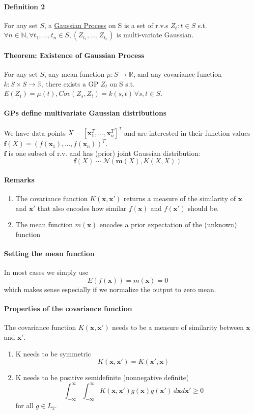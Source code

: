\documentclass[11pt]{article}
\newcommand{\tb}[1]{\textbf{#1}}
\newcommand{\under}[1]{\underline{#1}}
\newcommand{\real}[0]{\mathbb{R}}
\newcommand{\vx}[0]{\tb{x}}
\newcommand{\vf}[0]{\tb{f}}
\newcommand{\vm}[0]{\tb{m}}
\begin{document}
\paragraph{Definition 2}
For any set $S$, a \under{Gaussian Process} on S is a set of r.v.s $Z_t: t\in S$ s.t. $\forall n \in \mathbb{N}, \forall t_1,\hdots,t_n \in S, (Z_{t_1},\hdots, Z_{t_n})$ is multi-variate Gaussian.
\paragraph{Theorem: Existence of Gaussian Process}
For any set $S$, any mean function $\mu: S \rightarrow \real$, and any covariance function $k: S\times S \rightarrow \real$, there exists a GP $Z_t$ on S s.t. $E(Z_t) = \mu(t), Cov(Z_s, Z_t) = k(s,t) \, \forall s, t\in S$.

\paragraph{GPs define multivariate Gaussian distributions}
We have data points $X = [\vx_1^T, \hdots, \vx_n^T]^T$ and are interested in their function values $\tb{f}(X) = (f(\vx_1), \hdots, f(\vx_n))^T$.\\
$\tb{f}$ is one subset of r.v. and has (prior) joint Gaussian distribution:
$$\vf(X) \sim \mathcal{N}(\vm(X),K(X,X))$$
\paragraph{Remarks}
\begin{enumerate}
	\item The covariance function $K(\vx, \vx')$ returns a measure of the similarity of $\vx$ and $\vx'$ that also encodes how similar $f(\vx)$ and $f(\vx')$ should be.
	\item The mean function $m(\vx)$ encodes a prior expectation of the (unknown) function
\end{enumerate}

\paragraph{Setting the mean function}
In most cases we simply use
$$E(f(\vx)) = m(\vx) = 0$$
which makes sense especially if we normalize the output to zero mean.
\paragraph{Properties of the covariance function}
The covariance function $K(\vx,\vx')$ needs to be a measure of similarity between $\vx$ and $\vx'$.
\begin{enumerate}
	\item K needs to be symmetric $$K(\vx, \vx') = K(\vx', \vx)$$
	\item K needs to be positive semidefinite (nonnegative definite) $$\int_{-\infty}^\infty\int_{-\infty}^{\infty} K(\vx, \vx')g(\vx)g(\vx')\,d\vx d\vx' \geq 0$$ for all $g \in L_2$.
\end{enumerate}
\end{document}
